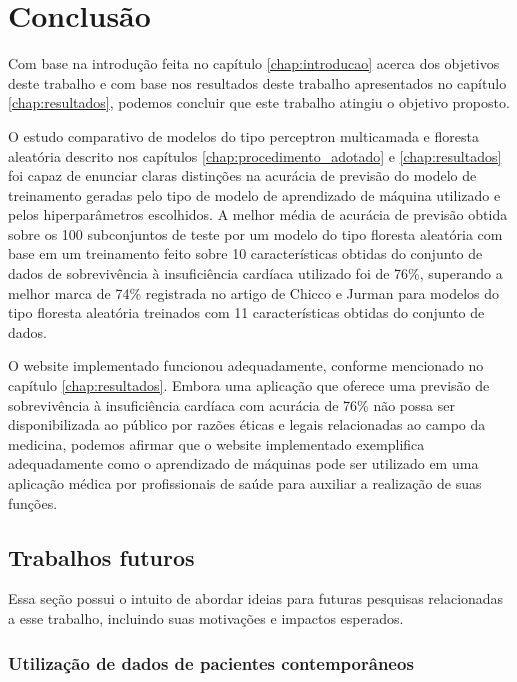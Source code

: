 \chapter{Conclusão} \label{chap:conclusao}

Com base na introdução feita no capítulo \ref{chap:introducao} acerca dos objetivos deste trabalho e com base nos resultados deste trabalho apresentados no capítulo \ref{chap:resultados}, podemos concluir que este trabalho atingiu o objetivo proposto.

O estudo comparativo de modelos do tipo perceptron multicamada e floresta aleatória descrito nos capítulos \ref{chap:procedimento_adotado} e \ref{chap:resultados} foi capaz de enunciar claras distinções na acurácia de previsão do modelo de treinamento geradas pelo tipo de modelo de aprendizado de máquina utilizado e pelos hiperparâmetros escolhidos. A melhor média de acurácia de previsão obtida sobre os 100 subconjuntos de teste por um modelo do tipo floresta aleatória com base em um treinamento feito sobre 10 características obtidas do conjunto de dados de sobrevivência à insuficiência cardíaca utilizado \cite{larxel_dataset} foi de 76\%, superando a melhor marca de 74\% registrada no artigo de Chicco e Jurman \cite{chicco2020} para modelos do tipo floresta aleatória treinados com 11 características obtidas do conjunto de dados.

O website implementado funcionou adequadamente, conforme mencionado no capítulo \ref{chap:resultados}. Embora uma aplicação que oferece uma previsão de sobrevivência à insuficiência cardíaca com acurácia de 76\% não possa ser disponibilizada ao público por razões éticas e legais relacionadas ao campo da medicina, podemos afirmar que o website implementado exemplifica adequadamente como o aprendizado de máquinas pode ser utilizado em uma aplicação médica por profissionais de saúde para auxiliar a realização de suas funções.

\section{Trabalhos futuros}

Essa seção possui o intuito de abordar ideias para futuras pesquisas relacionadas a esse trabalho, incluindo suas motivações e impactos esperados.

\subsection{Utilização de dados de pacientes contemporâneos}

